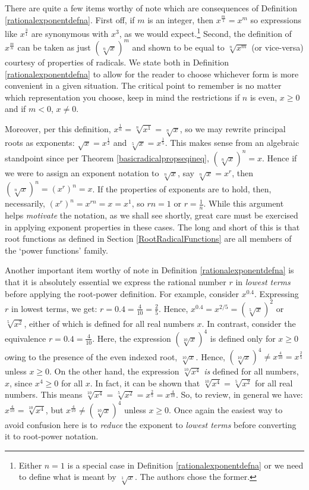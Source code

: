 \smallskip

There are quite a few items worthy of note which are consequences of Definition \ref{rationalexponentdefna}.  First off, if $m$ is an integer, then $x^{\frac{m}{1}}  = x^{m}$ so expressions like $x^{\frac{3}{1}}$  are synonymous with  $x^3$, as we would expect.\footnote{Either $n=1$ is a special case in Definition \ref{rationalexponentdefna} or we need to define what is meant by $\sqrt[1]{x}$.  The authors chose the former.}   Second, the definition of $x^{\frac{m}{n}}$ can be taken as just $\left(\sqrt[n]{x}\right)^m$ and shown to be equal to $\sqrt[n]{x^m}$ (or vice-versa) courtesy of properties of radicals.  We state both in  Definition \ref{rationalexponentdefna} to allow for the reader to choose whichever form is more convenient in a given situation.  The  critical point to remember is no matter which representation you choose, keep in mind the restrictions if $n$ is even, $x \geq 0$ and if $m < 0$, $x \neq 0$.  

Moreover,  per this definition,  $x^{\frac{1}{n}} = \sqrt[n]{x^{1}} = \sqrt[n]{x}$, so we may rewrite principal roots as exponents: $\sqrt{x} = x^{\frac{1}{2}}$ and $\sqrt[5]{x} = x^{\frac{1}{5}}$. This makes sense from an algebraic standpoint since per Theorem \ref{basicradicalpropseqineq}, $\left(\sqrt[n]{x} \right)^n = x$.  Hence if we were to assign an exponent notation to  $\sqrt[n]{x}$, say $\sqrt[n]{x} = x^r$, then  $\left(\sqrt[n]{x}\right)^n = (x^r)^n = x$.  If the properties of exponents are to hold, then, necessarily, $ (x^r)^n = x^{rn} = x = x^{1}$, so $rn = 1$ or $r = \frac{1}{n}$. While this argument helps \textit{motivate} the notation, as we shall see shortly, great care must be exercised in applying exponent properties in these cases.  The long and short of this is that root functions as defined in Section \ref{RootRadicalFunctions} are all members of the `power functions' family.
  
Another important item worthy of note in Definition \ref {rationalexponentdefna} is that it is absolutely essential  we express the rational number $r$ in \textit{lowest terms} before applying the root-power definition.  For example, consider $x^{0.4}$. Expressing $r$ in lowest terms, we get:  $r = 0.4 = \frac{4}{10} = \frac{2}{5}$.  Hence,  $x^{0.4} = x^{2/5} = (\sqrt[5]{x})^2$ or $\sqrt[5]{x^2}$, either of which is defined for all real numbers $x$.  In contrast, consider the equivalence $r = 0.4 = \frac{4}{10}$.  Here, the expression $(\sqrt[10]{x})^4$ is defined only for $x \geq 0$ owing to the presence of the even indexed root, $\sqrt[10]{x}$.  Hence, $(\sqrt[10]{x})^4 \neq x^{\frac{4}{10}} = x^{\frac{2}{5}}$ unless $x \geq 0$.   On the other hand,  the expression $\sqrt[10]{x^4}$ \textit{is} defined for all numbers, $x$, since $x^4 \geq 0$ for all $x$. In fact,  it can be shown that $\sqrt[10]{x^4} = \sqrt[5]{x^2}$ for all real numbers.  This means  $\sqrt[10]{x^4} =  \sqrt[5]{x^2} = x^{\frac{2}{5}} = x^{\frac{4}{10}}$.   So, to review, in general we have: $x^{\frac{4}{10}} = \sqrt[10]{x^4}$, but $x^{\frac{4}{10}}   \neq \left(\sqrt[10]{x}\right)^{4}$ unless $x \geq 0$.  Once again the easiest way to avoid confusion here is to \textit{reduce} the exponent to \textit{lowest terms} before converting it to root-power notation.


